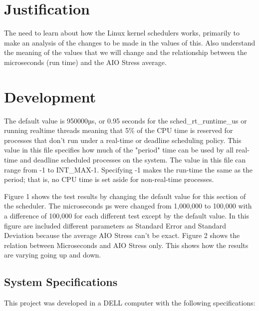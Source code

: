 \documentclass[a4paper]{article}
\begin{document}
\section {Justification}
The need to learn about how the Linux kernel schedulers works, primarily to make an analysis of the changes to be made in the values of this. Also understand the meaning of the values that we will change and the relationship between the microseconds (run time) and the AIO Stress average.
 
\section {Development}
The default value is 950000µs, or 0.95 seconds for the sched\_rt\_runtime\_us or running realtime threads meaning that 5\% of the CPU time is reserved for processes that don't run under a real-time or deadline scheduling policy. This value in this file specifies how much of the "period" time can be used by all real-time and deadline scheduled processes on the system.  The value in this file can range from -1 to INT\_MAX-1.  Specifying -1 makes the run-time the same as the period; that is, no CPU time is set aside for non-real-time processes. 

Figure 1 shows the test results by changing the default value for this section of the scheduler. The microseconds µs were changed from 1,000,000 to 100,000 with a difference of 100,000 for each different test except by the default value. In this figure are included different parameters as Standard Error and Standard Deviation because the average AIO Stress can't be exact.
Figure 2 shows the relation between Microseconds and AIO Stress only. This shows how the results are varying going up and down.

\subsection{System Specifications}

This project was developed in a  DELL computer with the following specifications:
\end{document}
